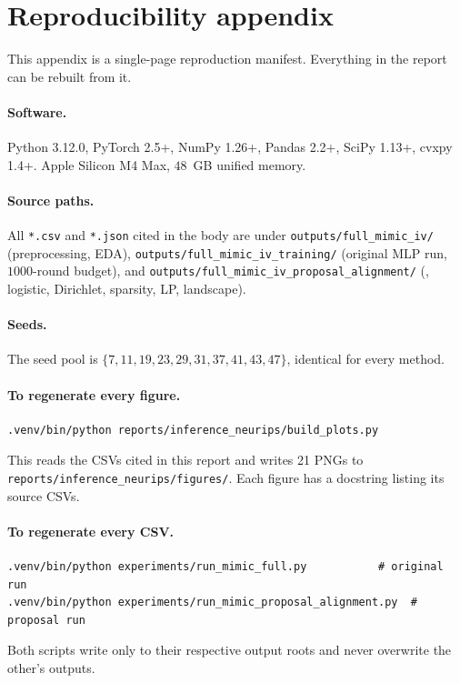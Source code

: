 \appendix
\section{Reproducibility appendix}
\label{sec:appendix}

This appendix is a single-page reproduction manifest. Everything in the report
can be rebuilt from it.

\paragraph{Software.} Python 3.12.0, PyTorch 2.5+, NumPy 1.26+, Pandas 2.2+,
SciPy 1.13+, cvxpy 1.4+. Apple Silicon M4 Max, $48$~GB unified memory.

\paragraph{Source paths.} All \texttt{*.csv} and \texttt{*.json} cited in the
body are under
\texttt{outputs/full\_mimic\_iv/} (preprocessing, EDA),
\texttt{outputs/full\_mimic\_iv\_training/} (original MLP run, $1000$-round
budget), and \texttt{outputs/full\_mimic\_iv\_proposal\_alignment/}
(\fedprox{}, logistic, Dirichlet, sparsity, LP, landscape).

\paragraph{Seeds.} The seed pool is $\{7, 11, 19, 23, 29, 31, 37, 41, 43,
47\}$, identical for every method.

\paragraph{To regenerate every figure.}
\begin{lstlisting}
.venv/bin/python reports/inference_neurips/build_plots.py
\end{lstlisting}
This reads the CSVs cited in this report and writes 21 PNGs to
\texttt{reports/inference\_neurips/figures/}. Each figure has a docstring
listing its source CSVs.

\paragraph{To regenerate every CSV.}
\begin{lstlisting}
.venv/bin/python experiments/run_mimic_full.py           # original run
.venv/bin/python experiments/run_mimic_proposal_alignment.py  # proposal run
\end{lstlisting}
Both scripts write only to their respective output roots and never overwrite
the other's outputs.

